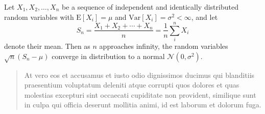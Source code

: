 Let $X_1, X_2, \ldots, X_n$ be a sequence of independent and identically distributed random variables with $\text{E}[X_i] = \mu$ and $\text{Var}[X_i] = \sigma^2 < \infty$, and let
\[S_n = \frac{X_1 + X_2 + \cdots + X_n}{n}
      = \frac{1}{n}\sum_{i}^{n} X_i\]
denote their mean. Then as $n$ approaches infinity, the random variables $\sqrt{n}(S_n - \mu)$ converge in distribution to a normal $\mathcal{N}(0, \sigma^2)$.

\begin{quote}
    At vero eos et accusamus et iusto odio dignissimos ducimus qui blanditiis praesentium voluptatum deleniti atque corrupti quos dolores et quas molestias excepturi sint occaecati cupiditate non provident, similique sunt in culpa qui officia deserunt mollitia animi, id est laborum et dolorum fuga.
\end{quote}